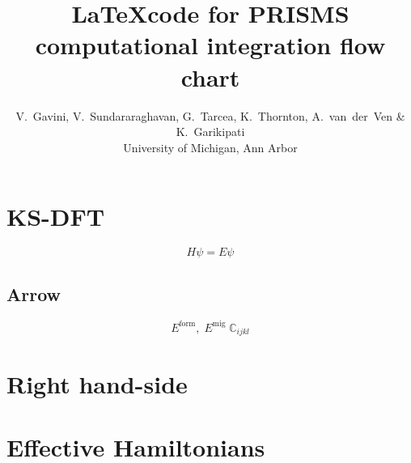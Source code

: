 \documentclass[11pt]{article}
\begin{document}
\def\bT{\mbox{\boldmath$ T$}}
\def\bU{\mbox{\boldmath$ U$}}
\def\bV{\mbox{\boldmath$ V$}}
\def\bW{\mbox{\boldmath$ W$}}
\def\bX{\mbox{\boldmath$ X$}}
\def\bY{\mbox{\boldmath$ Y$}}
\def\bZ{\mbox{\boldmath$ Z$}}
\def\ba{\mbox{\boldmath$ a$}}
\def\bb{\mbox{\boldmath$ b$}}
\def\bc{\mbox{\boldmath$ c$}}
\def\bd{\mbox{\boldmath$ d$}}
\def\be{\mbox{\boldmath$ e$}}
\def\bff{\mbox{\boldmath$ f$}}
\def\bg{\mbox{\boldmath$ g$}}
\def\bh{\mbox{\boldmath$ h$}}
\def\bi{\mbox{\boldmath$ i$}}
\def\bj{\mbox{\boldmath$ j$}}
\def\bk{\mbox{\boldmath$ k$}}
\def\bl{\mbox{\boldmath$ l$}}
\def\bm{\mbox{\boldmath$ m$}}
\def\bn{\mbox{\boldmath$ n$}}
\def\bo{\mbox{\boldmath$ o$}}
\def\bp{\mbox{\boldmath$ p$}}
\def\bq{\mbox{\boldmath$ q$}}
\def\br{\mbox{\boldmath$ r$}}
\def\bs{\mbox{\boldmath$ s$}}
\def\bt{\mbox{\boldmath$ t$}}
\def\bu{\mbox{\boldmath$ u$}}
\def\bv{\mbox{\boldmath$ v$}}
\def\bw{\mbox{\boldmath$ w$}}
\def\bx{\mbox{\boldmath$ x$}}
\def\by{\mbox{\boldmath$ y$}}
\def\bz{\mbox{\boldmath$ z$}}
\title{\LaTeX code for PRISMS computational integration flow chart}
\author{V.~Gavini, V.~Sundararaghavan, G.~Tarcea, K.~Thornton, A.~van~der~Ven \& K.~Garikipati \\ University of Michigan, Ann Arbor}
\maketitle
\section*{KS-DFT}
\begin{displaymath}
H\psi = E\psi
\end{displaymath}

\subsection*{Arrow}
\begin{displaymath}
E^\mathrm{form},\;E^\mathrm{mig}\;\mathbb{C}_{ijkl}
\end{displaymath}

\section*{Right hand-side}

\section*{Effective Hamiltonians}
\end{document}
